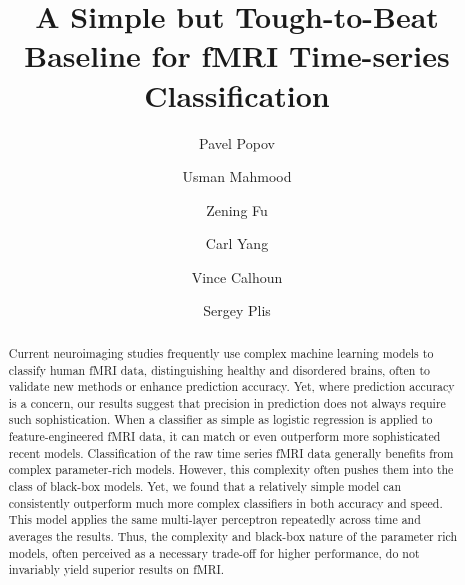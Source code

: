 \documentclass[final,5p,times,twocolumn,authoryear]{elsarticle}
\begin{document}
\begin{frontmatter}


\title{A Simple but Tough-to-Beat Baseline for fMRI Time-series Classification} %

\author[a,b]{Pavel Popov} %
\author[a]{Usman Mahmood} %
\author[a,b]{Zening Fu} %
\author[c]{Carl Yang} %
\author[a,b]{Vince Calhoun} %
\author[a,b]{Sergey Plis} %


\begin{abstract}
Current neuroimaging studies frequently use complex machine learning models to classify human fMRI data, distinguishing healthy and disordered brains, often to validate new methods or enhance prediction accuracy. Yet, where prediction accuracy is a concern, our results suggest that precision in prediction does not always require such sophistication. When a classifier as simple as logistic regression is applied to feature-engineered fMRI data, it can match or even outperform more sophisticated recent models. Classification of the raw time series fMRI data generally benefits from complex parameter-rich models. However, this complexity often pushes them into the class of black-box models. Yet, we found that a relatively simple model can consistently outperform much more complex classifiers in both accuracy and speed. This model applies the same multi-layer perceptron repeatedly across time and averages the results. Thus, the complexity and black-box nature of the parameter rich models, often perceived as a necessary trade-off for higher performance, do not invariably yield superior results on fMRI.


\end{abstract}
\end{frontmatter}
\end{document}
